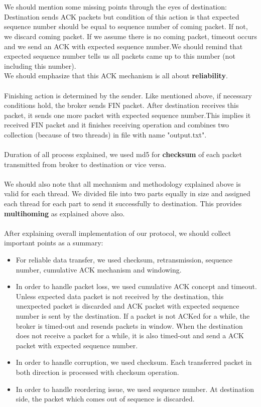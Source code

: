 \documentclass[conference]{IEEEtran}
\begin{document}
\\
\\
We should mention some missing points through the eyes of destination:\\
Destination sends ACK packets but condition of this action is that expected sequence number should be equal to sequence number of coming packet. If not, we discard coming packet. If we assume there is no coming packet, timeout occurs and we send an ACK with expected sequence number.We should remind that expected sequence number tells us all packets came up to this number (not including this number).\\We should emphasize that this ACK mechanism is all about \textbf{reliability}.\\
\\
Finishing action is determined by the sender. Like mentioned above, if necessary conditions hold, the broker sends FIN packet. After destination receives this packet, it sends one more packet with expected sequence number.This implies it received FIN packet and it finishes receiving operation and combines two collection (because of two threads) in  file with name "output.txt".\\
\\
Duration of all process explained, we used md5 for \textbf{checksum} of each packet transmitted from broker to destination or vice versa.\\
\\
We should also note that all mechanism and methodology explained above is valid for each thread. We divided file into two parts equally in size and assigned each thread for each part to send it successfully to destination. This provides \textbf{multihoming} as explained above also.\\
\\

After explaining overall implementation of our protocol, we should collect important points as a summary:\\
\begin{itemize}
\item For reliable data transfer, we used checksum, retransmission, sequence number, cumulative ACK mechanism and windowing.
\item In order to handle packet loss, we used cumulative ACK concept and timeout. Unless expected data packet is not received by the destination, this unexpected packet is discarded and ACK packet with expected sequence number is sent by the destination. If a packet is not ACKed for a while, the broker is timed-out and resends packets in window. When the destination does not receive a packet for a while, it is also timed-out and send a ACK packet with expected sequence number.
\item In order to handle corruption, we used checksum. Each transferred packet in both direction is processed with checksum operation.
\item In order to handle reordering issue, we used sequence number. At destination side, the packet which comes out of sequence is discarded.
\end{itemize}
\end{document}

